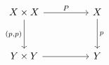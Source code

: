 \[
\begin{tikzcd}[column sep=4.6em, row sep=3.0em]
 X\times X \arrow[r,"P"] \arrow[d,"{(p,p)}"'] & X \arrow[d,"p"] \\
 Y\times Y \arrow[r]                         & Y
\end{tikzcd}
\]
